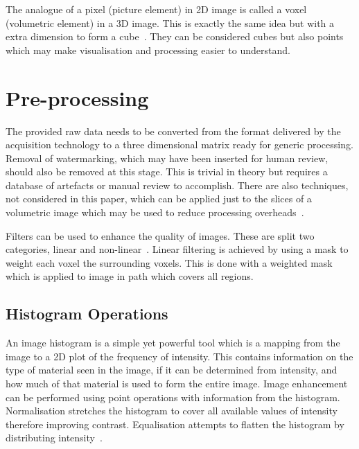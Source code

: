 \documentclass[journal]{IEEEtran}
\begin{document}
The analogue of a pixel (picture element) in 2D image is called a voxel (volumetric element) in a 3D image.
This is exactly the same idea but with a extra dimension to form a cube~\cite{lohmann1998volumetric}.
They can be considered cubes but also points which may make visualisation and processing easier to understand.










\section{Pre-processing}
\label{sec:pre}

The provided raw data needs to be converted from the format delivered by the acquisition technology to a three dimensional matrix ready for generic processing.
Removal of watermarking, which may have been inserted for human review, should also be removed at this stage. 
This is trivial in theory but requires a database of artefacts or manual review to accomplish.
There are also techniques, not considered in this paper, which can be applied just to the slices of a volumetric image which may be used to reduce processing overheads~\cite{harauz86exact}.

Filters can be used to enhance the quality of images.
These are split two categories, linear and non-linear~\cite{lohmann1998volumetric}.
Linear filtering is achieved by using a mask to weight each voxel the surrounding voxels.
This is done with a weighted mask which is applied to image in path which covers all regions.


\subsection{Histogram Operations}

An image histogram is a simple yet powerful tool which is a mapping from the image to a 2D plot of the frequency of intensity.
This contains information on the type of material seen in the image, if it can be determined from intensity, and how much of that material is used to form the entire image.
Image enhancement can be performed using point operations with information from the histogram.
Normalisation stretches the histogram to cover all available values of intensity therefore improving contrast.
Equalisation attempts to flatten the histogram by distributing intensity~\cite{nixon02feature}.
\end{document}
